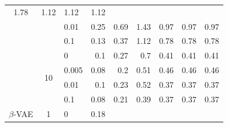 \begin{table}[htbp]
\begin{tabular}{|c|clrrrrrr|}
      \cellcolor[rgb]{ .388,  .745,  .482}1.78 &
      \cellcolor[rgb]{ .635,  .824,  .537}1.12 &
      \cellcolor[rgb]{ .635,  .824,  .537}1.12 &
      \cellcolor[rgb]{ .635,  .824,  .537}1.12
      \\
     &
       &
      0.01 &
      \cellcolor[rgb]{ .957,  .925,  .604}0.25 &
      \cellcolor[rgb]{ .796,  .875,  .569}0.69 &
      \cellcolor[rgb]{ .522,  .788,  .51}1.43 &
      \cellcolor[rgb]{ .69,  .843,  .549}0.97 &
      \cellcolor[rgb]{ .69,  .843,  .549}0.97 &
      \cellcolor[rgb]{ .69,  .843,  .549}0.97
      \\
     &
       &
      0.1 &
      \cellcolor[rgb]{ 1,  .937,  .612}0.13 &
      \cellcolor[rgb]{ .914,  .91,  .596}0.37 &
      \cellcolor[rgb]{ .635,  .824,  .537}1.12 &
      \cellcolor[rgb]{ .761,  .863,  .561}0.78 &
      \cellcolor[rgb]{ .761,  .863,  .561}0.78 &
      \cellcolor[rgb]{ .761,  .863,  .561}0.78
      \\
\cmidrule{2-9}     &
      \multirow{4}[2]{*}{10} &
      0 &
      \cellcolor[rgb]{ .98,  .933,  .608}0.1 &
      \cellcolor[rgb]{ .816,  .878,  .573}0.27 &
      \cellcolor[rgb]{ .388,  .745,  .482}0.7 &
      \cellcolor[rgb]{ .675,  .835,  .545}0.41 &
      \cellcolor[rgb]{ .675,  .835,  .545}0.41 &
      \cellcolor[rgb]{ .675,  .835,  .545}0.41
      \\
     &
       &
      0.005 &
      \cellcolor[rgb]{ 1,  .937,  .612}0.08 &
      \cellcolor[rgb]{ .882,  .902,  .588}0.2 &
      \cellcolor[rgb]{ .576,  .808,  .525}0.51 &
      \cellcolor[rgb]{ .627,  .82,  .533}0.46 &
      \cellcolor[rgb]{ .627,  .82,  .533}0.46 &
      \cellcolor[rgb]{ .627,  .82,  .533}0.46
      \\
     &
       &
      0.01 &
      \cellcolor[rgb]{ .98,  .933,  .608}0.1 &
      \cellcolor[rgb]{ .855,  .894,  .584}0.23 &
      \cellcolor[rgb]{ .569,  .804,  .522}0.52 &
      \cellcolor[rgb]{ .718,  .851,  .553}0.37 &
      \cellcolor[rgb]{ .718,  .851,  .553}0.37 &
      \cellcolor[rgb]{ .718,  .851,  .553}0.37
      \\
     &
       &
      0.1 &
      \cellcolor[rgb]{ 1,  .937,  .612}0.08 &
      \cellcolor[rgb]{ .875,  .898,  .588}0.21 &
      \cellcolor[rgb]{ .694,  .843,  .549}0.39 &
      \cellcolor[rgb]{ .718,  .851,  .553}0.37 &
      \cellcolor[rgb]{ .718,  .851,  .553}0.37 &
      \cellcolor[rgb]{ .718,  .851,  .553}0.37
      \\
    \midrule
    \multirow{12}[6]{*}{$\beta$-VAE} &
      \multirow{4}[2]{*}{1} &
      0 &
      \cellcolor[rgb]{ 1,  .937,  .612}0.18 &

\end{tabular}
\end{table}
